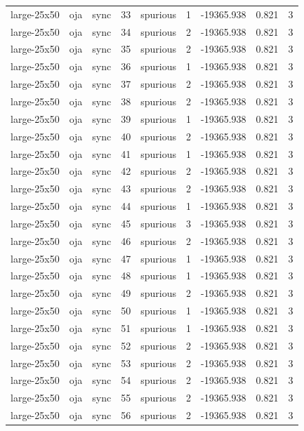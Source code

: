 \begin{tabular}{lllrlrrrr}
large-25x50 & oja & sync & 33 & spurious & 1 & -19365.938 & 0.821 & 3 \\
large-25x50 & oja & sync & 34 & spurious & 2 & -19365.938 & 0.821 & 3 \\
large-25x50 & oja & sync & 35 & spurious & 2 & -19365.938 & 0.821 & 3 \\
large-25x50 & oja & sync & 36 & spurious & 1 & -19365.938 & 0.821 & 3 \\
large-25x50 & oja & sync & 37 & spurious & 2 & -19365.938 & 0.821 & 3 \\
large-25x50 & oja & sync & 38 & spurious & 2 & -19365.938 & 0.821 & 3 \\
large-25x50 & oja & sync & 39 & spurious & 1 & -19365.938 & 0.821 & 3 \\
large-25x50 & oja & sync & 40 & spurious & 2 & -19365.938 & 0.821 & 3 \\
large-25x50 & oja & sync & 41 & spurious & 1 & -19365.938 & 0.821 & 3 \\
large-25x50 & oja & sync & 42 & spurious & 2 & -19365.938 & 0.821 & 3 \\
large-25x50 & oja & sync & 43 & spurious & 2 & -19365.938 & 0.821 & 3 \\
large-25x50 & oja & sync & 44 & spurious & 1 & -19365.938 & 0.821 & 3 \\
large-25x50 & oja & sync & 45 & spurious & 3 & -19365.938 & 0.821 & 3 \\
large-25x50 & oja & sync & 46 & spurious & 2 & -19365.938 & 0.821 & 3 \\
large-25x50 & oja & sync & 47 & spurious & 1 & -19365.938 & 0.821 & 3 \\
large-25x50 & oja & sync & 48 & spurious & 1 & -19365.938 & 0.821 & 3 \\
large-25x50 & oja & sync & 49 & spurious & 2 & -19365.938 & 0.821 & 3 \\
large-25x50 & oja & sync & 50 & spurious & 1 & -19365.938 & 0.821 & 3 \\
large-25x50 & oja & sync & 51 & spurious & 1 & -19365.938 & 0.821 & 3 \\
large-25x50 & oja & sync & 52 & spurious & 2 & -19365.938 & 0.821 & 3 \\
large-25x50 & oja & sync & 53 & spurious & 2 & -19365.938 & 0.821 & 3 \\
large-25x50 & oja & sync & 54 & spurious & 2 & -19365.938 & 0.821 & 3 \\
large-25x50 & oja & sync & 55 & spurious & 2 & -19365.938 & 0.821 & 3 \\
large-25x50 & oja & sync & 56 & spurious & 2 & -19365.938 & 0.821 & 3 \\

\end{tabular}

